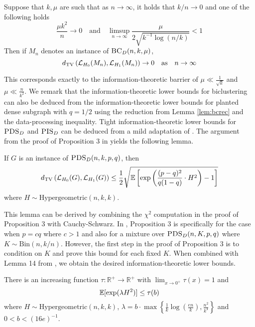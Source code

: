 \begin{theorem}
Suppose that $k, \mu$ are such that as $n \to \infty$, it holds that $k/n \to 0$ and one of the following holds
$$\frac{\mu k^2}{n} \to 0 \quad \text{and} \quad \limsup_{n \to \infty} \frac{\mu}{2\sqrt{k^{-1} \log(n/k)}} < 1$$
Then if $M_n$ denotes an instance of $\textsc{BC}_D(n, k, \mu)$,
$$d_{\text{TV}}\left( \mathcal{L}_{H_0}(M_n), \mathcal{L}_{H_1}(M_n) \right) \to 0 \quad \text{as} \quad n \to \infty$$
\end{theorem}

This corresponds exactly to the information-theoretic barrier of $\mu \ll \frac{1}{\sqrt{k}}$ and $\mu \ll \frac{n}{k^2}$. We remark that the information-theoretic lower bounds for biclustering can also be deduced from the information-theoretic lower bounds for planted dense subgraph with $q = 1/2$ using the reduction from Lemma \ref{lem:bcrec} and the data-processing inequality. Tight information-theoretic lower bounds for $\textsc{PDS}_D$ and $\textsc{PIS}_D$ can be deduced from a mild adaptation of \cite{hajek2015computational}. The argument from the proof of Proposition 3 in \cite{hajek2015computational} yields the following lemma.

\begin{lemma}
If $G$ is an instance of $\textsc{PDS}_D(n, k, p, q)$, then
$$d_{\text{TV}}\left( \mathcal{L}_{H_0}(G), \mathcal{L}_{H_1}(G) \right) \le \frac{1}{2} \sqrt{\mathbb{E} \left[ \exp\left( \frac{(p - q)^2}{q(1 - q)} \cdot H^2 \right) - 1 \right]}$$
where $H \sim \text{Hypergeometric}(n, k, k)$.
\end{lemma}

This lemma can be derived by combining the $\chi^2$ computation in the proof of Proposition 3 with Cauchy-Schwarz. In \cite{hajek2015computational}, Proposition 3 is specifically for the case when $p = cq$ where $c > 1$ and also for a mixture over $\textsc{PDS}_D(n, K, p, q)$ where $K \sim \text{Bin}(n, k/n)$. However, the first step in the proof of Proposition 3 is to condition on $K$ and prove this bound for each fixed $K$. When combined with Lemma 14 from \cite{hajek2015computational}, we obtain the desired information-theoretic lower bounds.

\begin{lemma} \label{lem:hgm}
There is an increasing function $\tau : \mathbb{R}^+ \to \mathbb{R}^+$ with $\lim_{x \to 0^+} \tau(x) = 1$ and
$$\mathbb{E}[\exp(\lambda H^2)] \le \tau(b)$$
where $H \sim \text{Hypergeometric}(n, k, k)$, $\lambda = b \cdot \max \left\{ \frac{1}{k} \log \left( \frac{en}{k} \right), \frac{n^2}{k^4} \right\}$ and $0 < b < (16e)^{-1}$.
\end{lemma}

